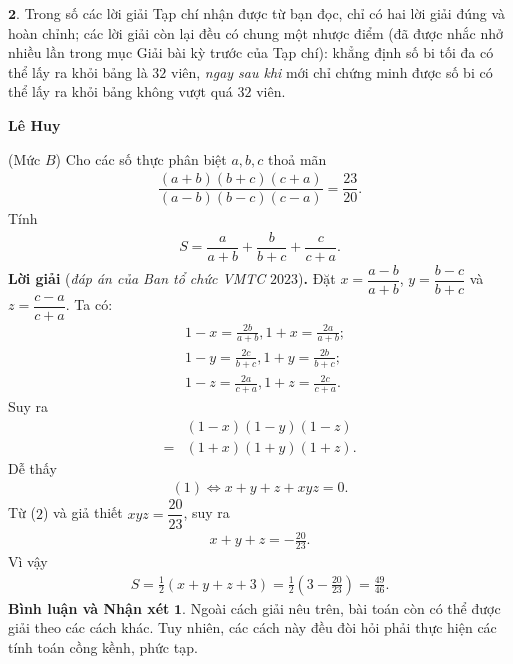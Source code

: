 \begin{multicols}{2}
	\vskip 0.05cm
	$\pmb{2.}$ Trong số các lời giải Tạp chí nhận được từ bạn đọc, chỉ có hai lời giải đúng và hoàn chỉnh; các lời giải còn lại đều có chung một nhược điểm (đã được nhắc nhở nhiều lần trong mục Giải bài kỳ trước của Tạp chí): khẳng định số bi tối đa có thể lấy ra khỏi bảng là $32$ viên, \textit{ngay sau khi} mới chỉ chứng minh được số bi có thể lấy ra khỏi bảng không vượt quá $32$ viên.
	\begin{flushright}
		\textbf{\color{thachthuctoanhoc}Lê Huy}
	\end{flushright}
	{}
	(Mức $B$) Cho các số thực phân biệt $a,b,c$  thoả mãn
	\begin{align*}
	\dfrac{(a+b)(b+c)(c+a)}{(a-b)(b-c)(c-a)}=\dfrac{23}{20}.
	\end{align*}
	Tính
	\begin{align*}
	S=\dfrac{a}{a+b}+\dfrac{b}{b+c}+\dfrac{c}{c+a}.
	\end{align*}
	\textbf{\color{thachthuctoanhoc}Lời giải} (\textit{đáp án của Ban tổ chức VMTC} $2023$)\textbf{\color{thachthuctoanhoc}.}
	\vskip 0.05cm
	Đặt $x = \dfrac{{a - b}}{{a + b}}$, $y = \dfrac{{b - c}}{{b + c}}$  và $z = \dfrac{{c - a}}{{c + a}}$.
	\vskip 0.05cm
	Ta có:
	\begin{align*}
		&1 - x = \frac{{2b}}{{a + b}}, 1 + x = \frac{{2a}}{{a + b}};\\
		&1 - y = \frac{{2c}}{{b + c}}, 1 + y = \frac{{2b}}{{b + c}};\\
		&1 - z = \frac{{2a}}{{c + a}}, 1 + z = \frac{{2c}}{{c + a}}.
	\end{align*}
	Suy ra
	\begin{align*}
		&(1 - x)(1 - y)(1 - z) \\
		= &(1 + x)(1 + y)(1 + z). \tag{$1$}
	\end{align*}
	Dễ thấy
	\begin{align*}
		(1) \Leftrightarrow x + y + z + xyz = 0. \tag{$2$}
	\end{align*}
	Từ ($2$) và giả thiết $xyz = \dfrac{20}{23}$, suy ra
	\begin{align*}
		x + y + z =  - \frac{{20}}{{23}}.
	\end{align*}
	Vì vậy
	\begin{align*}
		S = \frac{1}{2}\left( {x + y + z + 3} \right) = \frac{1}{2}\left( {3 - \frac{{20}}{{23}}} \right) = \frac{{49}}{{46}}.
	\end{align*}
	\textbf{\color{thachthuctoanhoc}Bình luận và Nhận xét}
	\vskip 0.05cm
	$\pmb{1.}$ Ngoài cách giải nêu trên, bài toán còn có thể được giải theo các cách khác. Tuy nhiên, các cách này đều đòi hỏi phải thực hiện các tính toán cồng kềnh, phức tạp.

\end{multicols}

